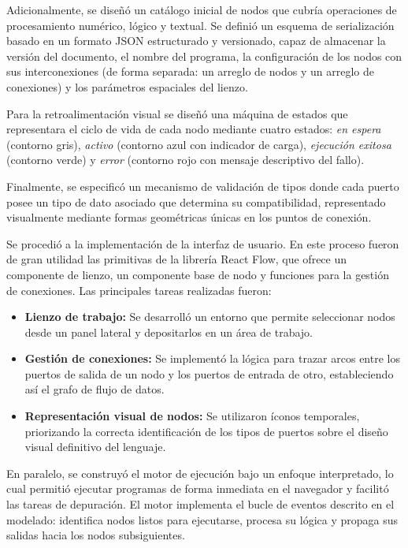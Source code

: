 Adicionalmente, se diseñó un catálogo inicial de nodos que cubría operaciones de procesamiento numérico, lógico y textual. Se definió un esquema de serialización basado en un formato JSON estructurado y versionado, capaz de almacenar la versión del documento, el nombre del programa, la configuración de los nodos con sus interconexiones (de forma separada: un arreglo de nodos y un arreglo de conexiones) y los parámetros espaciales del lienzo.

Para la retroalimentación visual se diseñó una máquina de estados que representara el ciclo de vida de cada nodo mediante cuatro estados: \textit{en espera} (contorno gris), \textit{activo} (contorno azul con indicador de carga), \textit{ejecución exitosa} (contorno verde) y \textit{error} (contorno rojo con mensaje descriptivo del fallo).

Finalmente, se especificó un mecanismo de validación de tipos donde cada puerto posee un tipo de dato asociado que determina su compatibilidad, representado visualmente mediante formas geométricas únicas en los puntos de conexión.

Se procedió a la implementación de la interfaz de usuario. En este proceso fueron de gran utilidad las primitivas de la librería React Flow, que ofrece un componente de lienzo, un componente base de nodo y funciones para la gestión de conexiones. Las principales tareas realizadas fueron:

\begin{itemize}
    \item \textbf{Lienzo de trabajo:} Se desarrolló un entorno que permite seleccionar nodos desde un panel lateral y depositarlos en un área de trabajo.
    \item \textbf{Gestión de conexiones:} Se implementó la lógica para trazar arcos entre los puertos de salida de un nodo y los puertos de entrada de otro, estableciendo así el grafo de flujo de datos.
    \item \textbf{Representación visual de nodos:} Se utilizaron íconos temporales, priorizando la correcta identificación de los tipos de puertos sobre el diseño visual definitivo del lenguaje.
\end{itemize}

En paralelo, se construyó el motor de ejecución bajo un enfoque interpretado, lo cual permitió ejecutar programas de forma inmediata en el navegador y facilitó las tareas de depuración. El motor implementa el bucle de eventos descrito en el modelado: identifica nodos listos para ejecutarse, procesa su lógica y propaga sus salidas hacia los nodos subsiguientes.

